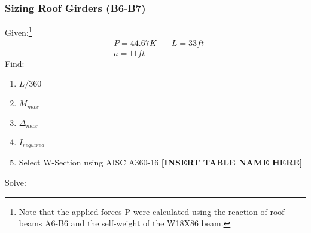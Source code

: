 \documentclass{report} %
\begin{document}
\newpage
\subsubsection*{Sizing Roof Girders (B6-B7)}
Given:\footnote{Note that the applied forces P were calculated using the reaction of roof beams A6-B6 and the self-weight of the W18X86 beam.}
\begin{equation*}
    \begin{aligned}
        &P = 44.67K &\quad L = 33ft \\%
        &a = 11ft 
    \end{aligned}
\end{equation*}
Find: %
\begin{enumerate}
    \item $L/360$
    \item $M_{max}$
    \item $\Delta _{max}$
    \item $I_{required}$
    \item Select W-Section using AISC A360-16 \textbf{[INSERT TABLE NAME HERE]}
\end{enumerate}
Solve:
\end{document}
